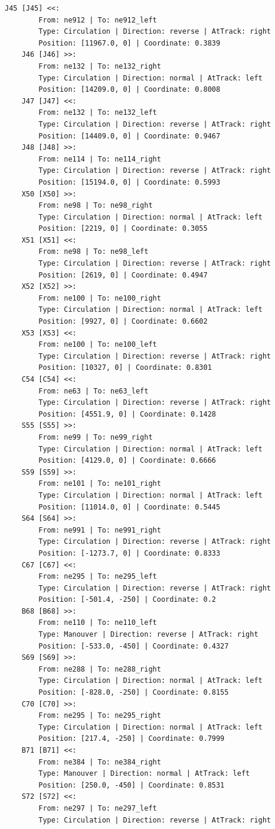 \begin{lstlisting}[language = {}, tabsize=4, basicstyle=\footnotesize\ttfamily, showspaces=false, showstringspaces=false, caption = Signalling.RNA, label = {lst:EJ4_6}]
	J45 [J45] <<:
		From: ne912 | To: ne912_left
		Type: Circulation | Direction: reverse | AtTrack: right 
		Position: [11967.0, 0] | Coordinate: 0.3839
	J46 [J46] >>:
		From: ne132 | To: ne132_right
		Type: Circulation | Direction: normal | AtTrack: left 
		Position: [14209.0, 0] | Coordinate: 0.8008
	J47 [J47] <<:
		From: ne132 | To: ne132_left
		Type: Circulation | Direction: reverse | AtTrack: right 
		Position: [14409.0, 0] | Coordinate: 0.9467
	J48 [J48] >>:
		From: ne114 | To: ne114_right
		Type: Circulation | Direction: reverse | AtTrack: right 
		Position: [15194.0, 0] | Coordinate: 0.5993
	X50 [X50] >>:
		From: ne98 | To: ne98_right
		Type: Circulation | Direction: normal | AtTrack: left 
		Position: [2219, 0] | Coordinate: 0.3055
	X51 [X51] <<:
		From: ne98 | To: ne98_left
		Type: Circulation | Direction: reverse | AtTrack: right 
		Position: [2619, 0] | Coordinate: 0.4947
	X52 [X52] >>:
		From: ne100 | To: ne100_right
		Type: Circulation | Direction: normal | AtTrack: left 
		Position: [9927, 0] | Coordinate: 0.6602
	X53 [X53] <<:
		From: ne100 | To: ne100_left
		Type: Circulation | Direction: reverse | AtTrack: right 
		Position: [10327, 0] | Coordinate: 0.8301
	C54 [C54] <<:
		From: ne63 | To: ne63_left
		Type: Circulation | Direction: reverse | AtTrack: right 
		Position: [4551.9, 0] | Coordinate: 0.1428
	S55 [S55] >>:
		From: ne99 | To: ne99_right
		Type: Circulation | Direction: normal | AtTrack: left 
		Position: [4129.0, 0] | Coordinate: 0.6666
	S59 [S59] >>:
		From: ne101 | To: ne101_right
		Type: Circulation | Direction: normal | AtTrack: left 
		Position: [11014.0, 0] | Coordinate: 0.5445
	S64 [S64] >>:
		From: ne991 | To: ne991_right
		Type: Circulation | Direction: reverse | AtTrack: right 
		Position: [-1273.7, 0] | Coordinate: 0.8333
	C67 [C67] <<:
		From: ne295 | To: ne295_left
		Type: Circulation | Direction: reverse | AtTrack: right 
		Position: [-501.4, -250] | Coordinate: 0.2
	B68 [B68] >>:
		From: ne110 | To: ne110_left
		Type: Manouver | Direction: reverse | AtTrack: right 
		Position: [-533.0, -450] | Coordinate: 0.4327
	S69 [S69] >>:
		From: ne288 | To: ne288_right
		Type: Circulation | Direction: normal | AtTrack: left 
		Position: [-828.0, -250] | Coordinate: 0.8155
	C70 [C70] >>:
		From: ne295 | To: ne295_right
		Type: Circulation | Direction: normal | AtTrack: left 
		Position: [217.4, -250] | Coordinate: 0.7999
	B71 [B71] <<:
		From: ne384 | To: ne384_right
		Type: Manouver | Direction: normal | AtTrack: left 
		Position: [250.0, -450] | Coordinate: 0.8531
	S72 [S72] <<:
		From: ne297 | To: ne297_left
		Type: Circulation | Direction: reverse | AtTrack: right 

\end{lstlisting}
